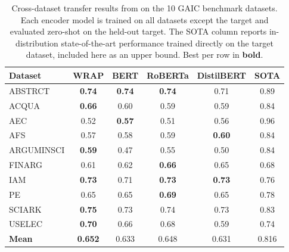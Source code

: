\begin{table}[ht]
\centering
\caption{Cross-dataset transfer results from \citet{Feger2025-kz} on the 10 
GAIC benchmark datasets. Each encoder model is trained on all datasets except 
the target and evaluated zero-shot on the held-out target. The SOTA column 
reports in-distribution state-of-the-art performance trained directly on the 
target dataset, included here as an upper bound. Best per row in \textbf{bold}.}
\label{tab:feger_baselines}
\begin{tabular}{lccccc}
\toprule
\textbf{Dataset} & \textbf{WRAP} & \textbf{BERT} & \textbf{RoBERTa} & \textbf{DistilBERT} & \textbf{SOTA} \\
\midrule
ABSTRCT     & \textbf{0.74} & \textbf{0.74} & \textbf{0.74} & 0.71          & 0.89 \\
ACQUA       & \textbf{0.66} & 0.60          & 0.59          & 0.59          & 0.84 \\
AEC         & 0.52          & \textbf{0.57} & 0.51          & 0.56          & 0.96 \\
AFS         & 0.57          & 0.58          & 0.59          & \textbf{0.60} & 0.84 \\
ARGUMINSCI  & \textbf{0.59} & 0.47          & 0.55          & 0.50          & 0.84 \\
FINARG      & 0.61          & 0.62          & \textbf{0.66} & 0.65          & 0.68 \\
IAM         & \textbf{0.73} & 0.71          & \textbf{0.73} & \textbf{0.73} & 0.76 \\
PE          & 0.65          & 0.65          & \textbf{0.69} & 0.65          & 0.78 \\
SCIARK      & \textbf{0.75} & 0.73          & 0.74          & 0.73          & 0.83 \\
USELEC      & \textbf{0.70} & 0.66          & 0.68          & 0.59          & 0.74 \\
\midrule
\textbf{Mean} & \textbf{0.652} & 0.633 & 0.648 & 0.631 & 0.816 \\
\bottomrule
\end{tabular}
\end{table}